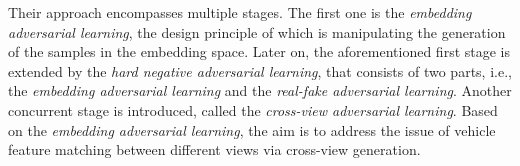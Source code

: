 Their approach encompasses multiple stages. The first one is the \emph{embedding adversarial learning}, the design principle of which is manipulating the generation of the samples in the embedding space. Later on, the aforementioned first stage is extended by the \emph{hard negative adversarial learning}, that consists of two parts, i.e., the \emph{embedding adversarial learning} and the \emph{real-fake adversarial learning}. Another concurrent stage is introduced, called the \emph{cross-view adversarial learning}. Based on the \emph{embedding adversarial learning}, the aim is to address the issue of vehicle feature matching between different views via cross-view generation.
